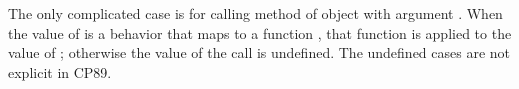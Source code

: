 \begin{AgdaAlign}
\begin{code}
\AgdaSpace{}%
\AgdaSymbol{)}\AgdaSpace{}%
\AgdaSymbol{)}\AgdaSpace{}%
\AgdaSymbol{)}\AgdaSpace{}%
\AgdaOperator{\AgdaBound{,}}\<%
\\
%
\>[67]\AgdaSymbol{(}\AgdaSpace{}%
\AgdaSpace{}%
\AgdaBound{\AgdaUnderscore{}}\AgdaSpace{}%
\AgdaSpace{}%
\AgdaSpace{}%
\AgdaSymbol{)}\<%
\\
\>[.][@{}l@{}]\<[486I]%
\>[64]\AgdaOperator{\AgdaBound{]⊥}}\AgdaSpace{}%
\AgdaSymbol{(}\AgdaSpace{}%
\AgdaSpace{}%
\AgdaSymbol{)}\AgdaSpace{}%
\AgdaSymbol{)}\AgdaSpace{}%
\AgdaOperator{\AgdaBound{,}}\<%
\\
\>[.][@{}l@{}]\<[482I]%
\>[56]\AgdaSymbol{(}\AgdaSpace{}%
\AgdaSpace{}%
\AgdaSpace{}%
\AgdaSpace{}%
\AgdaSpace{}%
\AgdaSymbol{)}\<%
\\
\>[.][@{}l@{}]\<[481I]%
\>[54]\AgdaOperator{\AgdaBound{]⊥}}\AgdaSpace{}%
\AgdaSymbol{(}\AgdaSpace{}%
\AgdaSymbol{(}\AgdaSpace{}%
\AgdaSymbol{(}\AgdaSpace{}%
\AgdaSpace{}%
\AgdaSpace{}%
\AgdaSpace{}%
\AgdaSymbol{)}\AgdaSpace{}%
\AgdaSymbol{))}\<%
\\
%
\>[6]\AgdaSpace{}%
\AgdaSpace{}%
\AgdaSpace{}%
%
\>[24]\AgdaSpace{}%
\AgdaSpace{}%
%
\>[41]\AgdaSymbol{=}\AgdaSpace{}%
\AgdaSpace{}%
\AgdaSpace{}%
\AgdaSpace{}%
\AgdaSpace{}%
\AgdaSpace{}%
\AgdaSpace{}%
\AgdaSpace{}%
\AgdaSymbol{(}\AgdaSpace{}%
\AgdaSymbol{(}\AgdaSpace{}%
\AgdaSpace{}%
\AgdaSpace{}%
\AgdaSpace{}%
\AgdaSymbol{)}\AgdaSpace{}%
\AgdaSymbol{)}\<%
\end{code}
%
The only complicated case is for calling method  of object  
with argument .
When the value of  is a behavior  that maps  to a function ,
that function is applied to the value of ;
otherwise the value of the call is undefined.
The undefined cases are not explicit in CP89.


\end{AgdaAlign}
